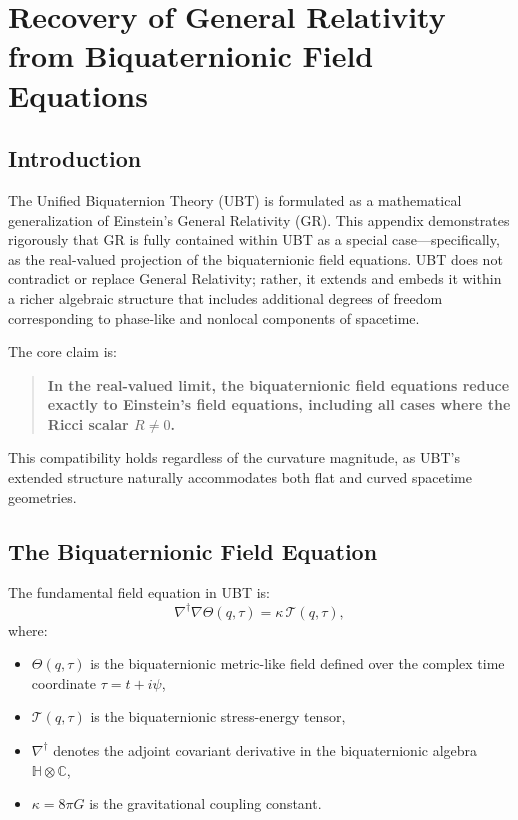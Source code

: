
\section{Recovery of General Relativity from Biquaternionic Field Equations}

\subsection{Introduction}

The Unified Biquaternion Theory (UBT) is formulated as a mathematical generalization of Einstein's General Relativity (GR). This appendix demonstrates rigorously that GR is fully contained within UBT as a special case—specifically, as the real-valued projection of the biquaternionic field equations. UBT does not contradict or replace General Relativity; rather, it extends and embeds it within a richer algebraic structure that includes additional degrees of freedom corresponding to phase-like and nonlocal components of spacetime.

The core claim is:
\begin{quote}
\textbf{In the real-valued limit, the biquaternionic field equations reduce exactly to Einstein's field equations, including all cases where the Ricci scalar $R \neq 0$.}
\end{quote}

This compatibility holds regardless of the curvature magnitude, as UBT's extended structure naturally accommodates both flat and curved spacetime geometries.

\subsection{The Biquaternionic Field Equation}

The fundamental field equation in UBT is:
\begin{equation}
\nabla^\dagger \nabla \Theta(q, \tau) = \kappa \, \mathcal{T}(q, \tau),
\label{eq:ubt_field_eq}
\end{equation}
where:
\begin{itemize}
  \item $\Theta(q, \tau)$ is the biquaternionic metric-like field defined over the complex time coordinate $\tau = t + i\psi$,
  \item $\mathcal{T}(q, \tau)$ is the biquaternionic stress-energy tensor,
  \item $\nabla^\dagger$ denotes the adjoint covariant derivative in the biquaternionic algebra $\mathbb{H} \otimes \mathbb{C}$,
  \item $\kappa = 8\pi G$ is the gravitational coupling constant.
\end{itemize}

